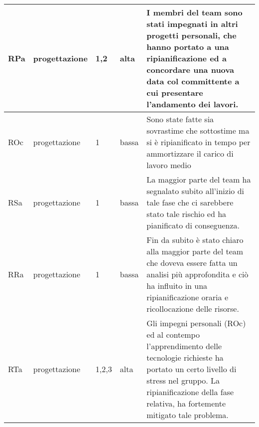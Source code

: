 {\begin{longtable}{|p{0.8cm}|p{2cm}|p{0.8cm}|p{0.8cm}|p{7.6cm}|}
        \hline
        RPa &
        progettazione &
        1,2 & 
        alta &
        I membri del team sono stati impegnati in altri progetti personali, che hanno portato a una ripianificazione ed a concordare una nuova data col committente a cui presentare l'andamento dei lavori.\\
        \hline
        ROc &
        progettazione &
        1 & 
        bassa &
        Sono state fatte sia sovrastime che sottostime ma si è ripianificato in tempo per ammortizzare il carico di lavoro medio\\
        \hline
        RSa &
        progettazione &
        1 & 
        bassa &
        La maggior parte del team ha segnalato subito all'inizio di tale fase che ci sarebbere stato tale rischio ed ha pianificato di conseguenza. \\
        \hline
        RRa &
        progettazione &
        1 & 
        bassa & 
         Fin da subito è stato chiaro alla maggior parte del team che doveva essere fatta un analisi più approfondita e ciò ha influito in una ripianificazione oraria e ricollocazione delle risorse.\\
        \hline
        RTa &
        progettazione &
        1,2,3 & 
        alta &
        Gli impegni personali (ROc) ed al contempo l'apprendimento delle tecnologie richieste ha portato un certo livello di stress nel gruppo. La ripianificazione della fase relativa, ha fortemente mitigato tale problema. \\
    \end{longtable}
}